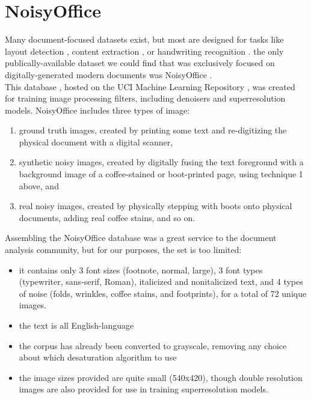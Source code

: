 \documentclass[runningheads]{llncs}
\begin{document}
\section{NoisyOffice}
Many document-focused datasets exist, but most are designed for tasks like layout detection \cite{ref_RDCL2019}, content extraction \cite{ref_tobacco800}, or handwriting recognition \cite{ref_icdar}. the only publically-available dataset we could find that was exclusively focused on digitally-generated modern documents was NoisyOffice \cite{ref_NoisyOffice}.\\

This database \cite{ref_NoisyOfficeDatabase}, hosted on the UCI Machine Learning Repository \cite{ref_UCIMLR}, was created for training image processing filters, including denoisers and superresolution models. NoisyOffice includes three types of image:

\begin{enumerate}
\item ground truth images, created by printing some text and re-digitizing the physical document with a digital scanner,
\item synthetic noisy images, created by digitally fusing the text foreground with a background image of a coffee-stained or boot-printed page, using technique 1 above, and
\item real noisy images, created by physically stepping with boots onto physical documents, adding real coffee stains, and so on.
\end{enumerate}

Assembling the NoisyOffice database was a great service to the document analysis community, but for our purposes, the set is too limited:

\begin{itemize}
\item it contains only 3 font sizes (footnote, normal, large), 3 font types (typewriter, sans-serif, Roman), italicized and nonitalicized text, and 4 types of noise (folds, wrinkles, coffee stains, and footprints), for a total of 72 unique images.
\item the text is all English-language
\item the corpus has already been converted to grayscale, removing any choice about which desaturation algorithm to use
\item the image sizes provided are quite small (540x420), though double resolution images are also provided for use in training superresolution models.
\end{itemize}
\end{document}
